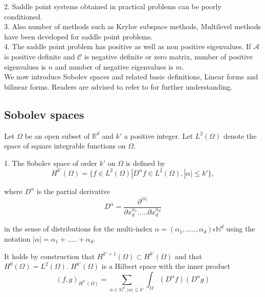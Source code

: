 \documentclass[a4paper]{book}
\begin{document}
\begin{appendices}
2. Saddle point systems obtained in practical problems can be poorly conditioned.\\

3. Also number of methods such as Krylov subspace methods, Multilevel methods have been developed for saddle point problems.\\

4. The saddle point problem has positive as well as non positive eigenvalues. If $\mathcal{A}$ is positive definite and $\mathcal{C}$ is negative definite or zero matrix, number of positive eigenvalues is $n$ and number of negative eigenvalues is $m$. \\

We now introduce Sobolev spaces and related basic definitions, Linear forms and bilinear forms. Readers are advised to refer to \cite{crbm} for further understanding.

\subsection{Sobolev spaces} 

Let $\Omega$ be an open subset of $\mathbb{R}^d$ and $k'$ a positive integer. Let $L^2(\Omega)$ denote the space of square integrable functions on $\Omega$. 

1. The Sobolev space of order $k'$ on $\Omega$ is defined by\\
\begin{equation}
H^{k'} (\Omega) = \lbrace f \in L^2 (\Omega) | D^\alpha f \in L^2 (\Omega), |\alpha| \leq k' \rbrace ,
\end{equation} 

where $D^\alpha$ is the partial derivative
\begin{equation}
D^\alpha = \frac{\partial^{|\alpha|}}{\partial x_d^{\alpha_1} ..... \partial x_d^{\alpha_d}}
\end{equation}

in the sense of distributions for the multi-index $\alpha = (\alpha_1,.....,\alpha_d) \epsilon \mathbb{N}^d$ using the notation $|\alpha| = \alpha_1 + ..... + \alpha_d $.

It holds by construction that $H^{k'+1}(\Omega) \subset H^{k'} (\Omega)$ and that $H^0 (\Omega) = L^2 (\Omega)$. $H^{k'}(\Omega)$ is a Hilbert space with the inner product
\begin{equation}
(f,g)_{H^{k'}(\Omega)} = \sum_{\alpha \in \mathbb{N}^d, |\alpha| \leq k'} \int_\Omega (D^\alpha f) (D^\alpha g)
\end{equation}


\end{appendices}
\end{document}
